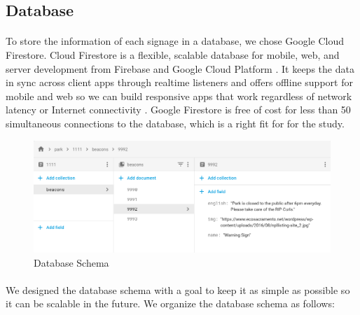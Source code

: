 \documentclass[12pt]{article}
\begin{document}
\subsection{Database}
\label{database}
\paragraph{}To store the information of each signage in a database, we chose Google Cloud Firestore. Cloud Firestore is a flexible, scalable database for mobile, web, and server development from Firebase and Google Cloud Platform \cite{firebase}. It keeps the data in sync across client apps through realtime listeners and offers offline support for mobile and web so we can build responsive apps that work regardless of network latency or Internet connectivity \cite{firebase}. Google Firestore is free of cost for less than 50 simultaneous connections to the database, which is a right fit for for the study.

\begin{figure}[H]
	\centering
	\includegraphics[width=1\linewidth]{media/db.png}
	\caption{Database Schema}
	\label{fig:db}
\end{figure} 

\paragraph{} We designed the database schema with a goal to keep it as simple as possible so it can be scalable in the future. We organize the database schema as follows:
\end{document}
